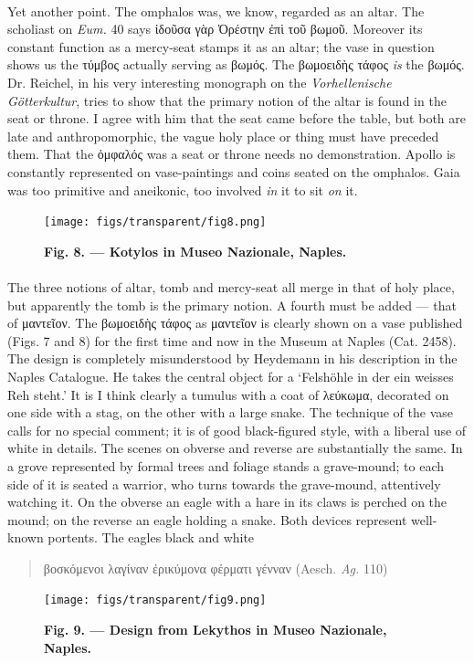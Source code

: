 \documentclass[a4paper, 11pt, oneside, polutonikogreek, english]{article}
\begin{document}
\paragraph{}
Yet another point. The omphalos was, we know, regarded as an altar. The scholiast on \emph{Eum.} 40 says ἰδοῦσα γὰρ Ὀρέστην ἐπὶ τοῦ βωμοῦ. Moreover its constant function as a mercy-seat stamps it as an altar; the vase in question shows us the τύμβος actually serving as βωμός. The βωμοειδὴς τάφος \emph{is} the βωμός. Dr. Reichel, in his very interesting monograph on the \emph{Vorhellenische Götterkultur}, tries to show that the primary notion of the altar is found in the seat or throne. I agree with him that the seat came before the table, but both are late and anthropomorphic, the vague holy place or thing must have preceded them. That the ὀμφαλός was a seat or throne needs no demonstration. Apollo is constantly represented on vase-paintings and coins seated on the omphalos. Gaia was too primitive and aneikonic, too involved \emph{in} it to sit \emph{on} it.
\begin{figure}[H]
\centering
\texttt{[image: figs/transparent/fig8.png]}
\caption{\bfseries Fig. 8. --- Kotylos in Museo Nazionale, Naples.}
\end{figure}
\paragraph{}
The three notions of altar, tomb and mercy-seat all merge in that of holy place, but apparently the tomb is the primary notion. A fourth must be added --- that of μαντεῖον. The βωμοειδὴς τάφος as μαντεῖον is clearly shown on a vase published (Figs. 7 and 8) for the first time and now in the Museum at Naples (Cat. 2458). The design is completely misunderstood by Heydemann in his description in the Naples Catalogue. He takes the central object for a `Felshöhle in der ein weisses Reh steht.' It is I think clearly a tumulus with a coat of λεύκωμα, decorated on one side with a stag, on the other with a large snake. The technique of the vase calls for no special comment; it is of good black-figured style, with a liberal use of white in details. The scenes on obverse and reverse are substantially the same. In a grove represented by formal trees and foliage stands a grave-mound; to each side of it is seated a warrior, who turns towards the grave-mound, attentively watching it. On the obverse an eagle with a hare in its claws is perched on the mound; on the reverse an eagle holding a snake. Both devices represent well-known portents. The eagles black and white
\begin{quotation}
\large
βοσκόμενοι λαγίναν ἐρικύμονα φέρματι γένναν (Aesch. \emph{Ag.} 110)
\end{quotation}
\begin{figure}[H]
\centering
\texttt{[image: figs/transparent/fig9.png]}
\caption{\bfseries Fig. 9. --- Design from Lekythos in Museo Nazionale, Naples.}
\end{figure}
\end{document}
